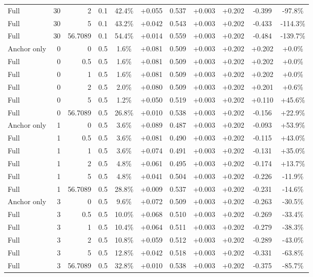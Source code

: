 \begin{table}[htbp]
\begin{tabular}{lrrrccccccc}
Full & 30 & 2 & 0.1 & 42.4\% & +0.055 & 0.537 & +0.003 & +0.202 & -0.399 & -97.8\% \\
Full & 30 & 5 & 0.1 & 43.2\% & +0.042 & 0.543 & +0.003 & +0.202 & -0.433 & -114.3\% \\
Full & 30 & 56.7089 & 0.1 & 54.4\% & +0.014 & 0.559 & +0.003 & +0.202 & -0.484 & -139.7\% \\
Anchor only & 0 & 0 & 0.5 & 1.6\% & +0.081 & 0.509 & +0.003 & +0.202 & +0.202 & +0.0\% \\
Full & 0 & 0.5 & 0.5 & 1.6\% & +0.081 & 0.509 & +0.003 & +0.202 & +0.202 & +0.0\% \\
Full & 0 & 1 & 0.5 & 1.6\% & +0.081 & 0.509 & +0.003 & +0.202 & +0.202 & +0.0\% \\
Full & 0 & 2 & 0.5 & 2.0\% & +0.080 & 0.509 & +0.003 & +0.202 & +0.201 & +0.6\% \\
Full & 0 & 5 & 0.5 & 1.2\% & +0.050 & 0.519 & +0.003 & +0.202 & +0.110 & +45.6\% \\
Full & 0 & 56.7089 & 0.5 & 26.8\% & +0.010 & 0.538 & +0.003 & +0.202 & -0.156 & +22.9\% \\
Anchor only & 1 & 0 & 0.5 & 3.6\% & +0.089 & 0.487 & +0.003 & +0.202 & -0.093 & +53.9\% \\
Full & 1 & 0.5 & 0.5 & 3.6\% & +0.081 & 0.490 & +0.003 & +0.202 & -0.115 & +43.0\% \\
Full & 1 & 1 & 0.5 & 3.6\% & +0.074 & 0.491 & +0.003 & +0.202 & -0.131 & +35.0\% \\
Full & 1 & 2 & 0.5 & 4.8\% & +0.061 & 0.495 & +0.003 & +0.202 & -0.174 & +13.7\% \\
Full & 1 & 5 & 0.5 & 4.8\% & +0.041 & 0.504 & +0.003 & +0.202 & -0.226 & -11.9\% \\
Full & 1 & 56.7089 & 0.5 & 28.8\% & +0.009 & 0.537 & +0.003 & +0.202 & -0.231 & -14.6\% \\
Anchor only & 3 & 0 & 0.5 & 9.6\% & +0.072 & 0.509 & +0.003 & +0.202 & -0.263 & -30.5\% \\
Full & 3 & 0.5 & 0.5 & 10.0\% & +0.068 & 0.510 & +0.003 & +0.202 & -0.269 & -33.4\% \\
Full & 3 & 1 & 0.5 & 10.4\% & +0.064 & 0.511 & +0.003 & +0.202 & -0.279 & -38.3\% \\
Full & 3 & 2 & 0.5 & 10.8\% & +0.059 & 0.512 & +0.003 & +0.202 & -0.289 & -43.0\% \\
Full & 3 & 5 & 0.5 & 12.8\% & +0.042 & 0.518 & +0.003 & +0.202 & -0.331 & -63.8\% \\
Full & 3 & 56.7089 & 0.5 & 32.8\% & +0.010 & 0.538 & +0.003 & +0.202 & -0.375 & -85.7\% \\

\end{tabular}
\end{table}
